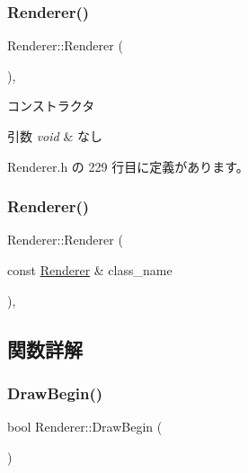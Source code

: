 \subsubsection{\texorpdfstring{Renderer()}{Renderer()}\hspace{0.1cm}{\footnotesize\ttfamily [1/2]}}
{\footnotesize\ttfamily Renderer\+::\+Renderer (\begin{DoxyParamCaption}{ }\end{DoxyParamCaption})\hspace{0.3cm}{\ttfamily [inline]}, {\ttfamily [private]}}



コンストラクタ 


\begin{DoxyParams}{引数}
{\em void} & なし \\
\hline
\end{DoxyParams}


 Renderer.\+h の 229 行目に定義があります。

\mbox{\label{class_renderer_a1e7732f4c952f3c13d9bb03a7510b7aa}} 
\subsubsection{\texorpdfstring{Renderer()}{Renderer()}\hspace{0.1cm}{\footnotesize\ttfamily [2/2]}}
{\footnotesize\ttfamily Renderer\+::\+Renderer (\begin{DoxyParamCaption}\item[{const \mbox{\hyperlink{class_renderer}{Renderer}} \&}]{class\+\_\+name }\end{DoxyParamCaption})\hspace{0.3cm}{\ttfamily [private]}, {\ttfamily [delete]}}



\subsection{関数詳解}
\mbox{\label{class_renderer_af420951c9c163f1151bd6600df204cee}} 
\subsubsection{\texorpdfstring{Draw\+Begin()}{DrawBegin()}}
{\footnotesize\ttfamily bool Renderer\+::\+Draw\+Begin (\begin{DoxyParamCaption}{ }\end{DoxyParamCaption})}



